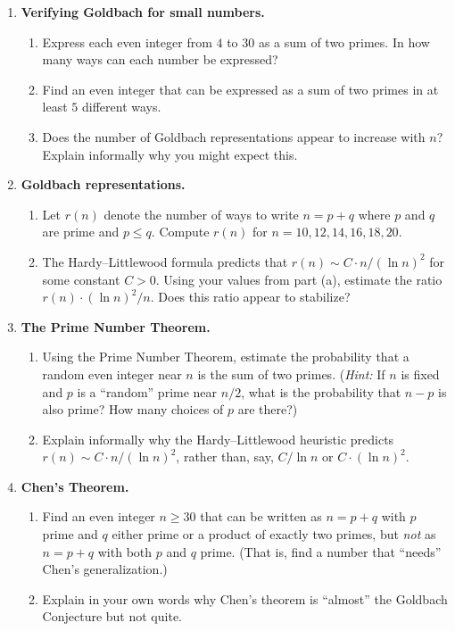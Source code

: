 \begin{enumerate}

    \item \textbf{Verifying Goldbach for small numbers.}
    \begin{enumerate}
        \item Express each even integer from $4$ to $30$ as a sum of two primes. In how many ways can each number be expressed?
        \item Find an even integer that can be expressed as a sum of two primes in at least $5$ different ways.
        \item Does the number of Goldbach representations appear to increase with $n$? Explain informally why you might expect this.
    \end{enumerate}

    \item \textbf{Goldbach representations.}
    \begin{enumerate}
        \item Let $r(n)$ denote the number of ways to write $n = p + q$ where $p$ and $q$ are prime and $p \leq q$. Compute $r(n)$ for $n = 10, 12, 14, 16, 18, 20$.
        \item The Hardy--Littlewood formula predicts that $r(n) \sim C \cdot n / (\ln n)^2$ for some constant $C > 0$. Using your values from part (a), estimate the ratio $r(n) \cdot (\ln n)^2 / n$. Does this ratio appear to stabilize?
    \end{enumerate}

    \item \textbf{The Prime Number Theorem.}
    \begin{enumerate}
        \item Using the Prime Number Theorem, estimate the probability that a random even integer near $n$ is the sum of two primes. (\emph{Hint:} If $n$ is fixed and $p$ is a ``random'' prime near $n/2$, what is the probability that $n - p$ is also prime? How many choices of $p$ are there?)
        \item Explain informally why the Hardy--Littlewood heuristic predicts $r(n) \sim C \cdot n / (\ln n)^2$, rather than, say, $C / \ln n$ or $C \cdot (\ln n)^2$.
    \end{enumerate}

    \item \textbf{Chen's Theorem.}
    \begin{enumerate}
        \item Find an even integer $n \geq 30$ that can be written as $n = p + q$ with $p$ prime and $q$ either prime or a product of exactly two primes, but \emph{not} as $n = p + q$ with both $p$ and $q$ prime. (That is, find a number that ``needs'' Chen's generalization.)
        \item Explain in your own words why Chen's theorem is ``almost'' the Goldbach Conjecture but not quite.
    \end{enumerate}


\end{enumerate}
